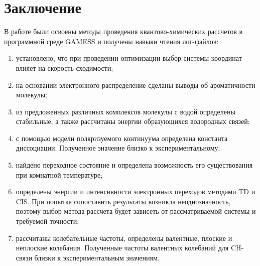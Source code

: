 \section{Заключение}
В работе были освоены методы проведения квантово-химических рассчетов в программной среде GAMESS и получены навыки чтения лог-файлов:
\begin{enumerate}
    \item установлено, что при проведении оптимизации выбор системы координат влияет на скорость сходимости;
    \item на основании электронного распределение сделаны выводы об ароматичности молекулы;
    \item из предложенных различных комплексов молекулы с водой определены стабильные, а также рассчитаны энергии образующихся водородных связей; 
    \item с помощью модели поляризуемого континуума определена константа диссоциации. Полученное значение близко к экспериментальному;
    \item найдено переходное состояние и определена возможность его существования при комнатной температуре; 
    \item определены энергии и интенсивности электронных переходов методами TD и CIS. При попытке сопоставить результаты возникла неоднозначность, поэтому выбор метода рассчета будет зависеть от рассматриваемой системы и требуемой точности;
    \item рассчитаны колебательные частоты, определены валентные, плоские и неплоские колебания. Полученные частоты валентных колебаний для CH-связи близки к экспериментальным значениям.
\end{enumerate}
